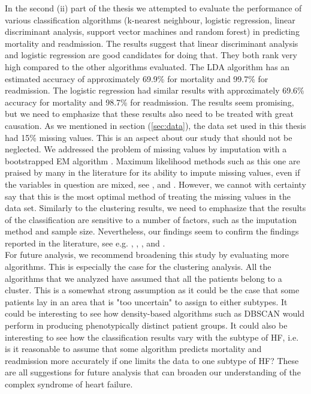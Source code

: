 \documentclass[../thesis.tex]{subfiles}
\begin{document}
\indent In the second (ii) part of the thesis we attempted to evaluate the performance of various classification algorithms (k-nearest neighbour, logistic regression, linear discriminant analysis, support vector machines and random forest) in predicting mortality and readmission. The results suggest that linear discriminant analysis and logistic regression are good candidates for doing that. They both rank very high compared to the other algorithms evaluated. The LDA algorithm has an estimated accuracy of approximately 69.9\% for mortality and 99.7\% for readmission. The logistic regression had similar results with approximately 69.6\% accuracy for mortality and 98.7\% for readmission. The results seem promising, but we need to emphasize that these results also need to be treated with great causation. As we mentioned in section (\ref{sec:data}), the data set used in this thesis had 15\% missing values. This is an aspect about our study that should not be neglected. We addressed the problem of missing values by imputation with a bootstrapped EM algorithm \citep{honaker2011amelia}. Maximum likelihood methods such as this one are praised by many in the literature for its ability to impute missing values, even if the variables in question are mixed, see \cite{schafer1997analysis}, \cite{schafer1998multiple} and \cite{allison1999missing}. However, we cannot with certainty say that this is the most optimal method of treating the missing values in the data set. Similarly to the clustering results, we need to emphasize that the results of the classification are sensitive to a number of factors, such as the imputation method and sample size. Nevertheless, our findings seem to confirm the findings reported in the literature, see e.g. \cite{austin2012regression}, \cite{zolfaghar2013big}, \cite{shah2014phenomapping}, \cite{panahiazar2015using} and \cite{koulaouzidis2016telemonitoring}.\\
\indent For future analysis, we recommend broadening this study by evaluating more algorithms. This is especially the case for the clustering analysis. All the algorithms that we analyzed have assumed that all the patients belong to a cluster. This is a somewhat strong assumption as it could be the case that some patients lay in an area that is "too uncertain" to assign to either subtypes. It could be interesting to see how density-based algorithms such as DBSCAN \citep{ester1996density} would perform in producing phenotypically distinct patient groups. It could also be interesting to see how the classification results vary with the subtype of HF, i.e. is it reasonable to assume that some algorithm predicts mortality and readmission more accurately if one limits the data to one subtype of HF? These are all suggestions for future analysis that can broaden our understanding of the complex syndrome of heart failure. 
\end{document}
